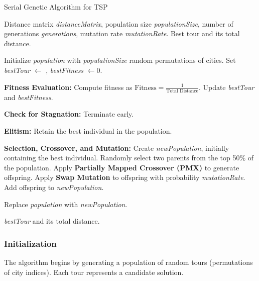 \documentclass[conference]{IEEEtran}
\begin{document}
\begin{algorithm}
\caption{Serial Genetic Algorithm for TSP}
\label{alg:genetic_algorithm}
\begin{algorithmic}[1]
\REQUIRE Distance matrix \textit{distanceMatrix}, population size \textit{populationSize}, number of generations \textit{generations}, mutation rate \textit{mutationRate}.
\ENSURE Best tour and its total distance.

\STATE Initialize \textit{population} with \textit{populationSize} random permutations of cities.
\STATE Set \textit{bestTour} $\leftarrow$ , \textit{bestFitness} $\leftarrow 0$.

    \STATE \textbf{Fitness Evaluation:}
        \STATE Compute fitness as $\text{Fitness} = \frac{1}{\text{Total Distance}}$.
            \STATE Update \textit{bestTour} and \textit{bestFitness}.
        \ENDIF
    \ENDFOR

    \STATE \textbf{Check for Stagnation:}
        \STATE Terminate early.
    \ENDIF

    \STATE \textbf{Elitism:} Retain the best individual in the population.

    \STATE \textbf{Selection, Crossover, and Mutation:}
    \STATE Create \textit{newPopulation}, initially containing the best individual.
        \STATE Randomly select two parents from the top 50\% of the population.
        \STATE Apply \textbf{Partially Mapped Crossover (PMX)} to generate offspring.
        \STATE Apply \textbf{Swap Mutation} to offspring with probability \textit{mutationRate}.
        \STATE Add offspring to \textit{newPopulation}.
    \ENDWHILE

    \STATE Replace \textit{population} with \textit{newPopulation}.
\ENDFOR

\RETURN \textit{bestTour} and its total distance.
\end{algorithmic}
\end{algorithm}

\subsubsection{Initialization}

The algorithm begins by generating a population of random tours (permutations of city indices). Each tour represents a candidate solution.\\
\end{document}
